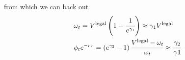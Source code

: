 \documentclass[12pt]{article}
\begin{document}

from which we can back out 
\begin{align*}
 &\omega_t=V^{\text{legal}}\left(1-\cfrac{1}{e^{\gamma_1}}\right)\approx\gamma_1V^{\text{legal}} \\
 &\phi_te^{-r\tau}=\left(e^{\gamma_2}-1\right)\cfrac{V^{\text{legal}}-\omega_t}{\omega_t}\approx\cfrac{\gamma_2}{\gamma1}
\end{align*}
\end{document}
